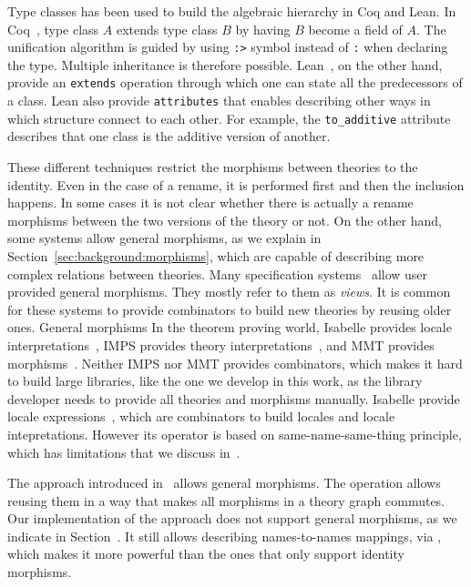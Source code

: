 Type classes has been used to build the algebraic hierarchy in Coq and Lean. In Coq~\cite{spitters2011type}, type class $A$ extends type class $B$ by having $B$ become a field of $A$. The unification algorithm is guided by using \verb|:>| symbol instead of \verb|:| when declaring the type. Multiple inheritance is therefore possible. Lean~\cite{lean2019}, on the other hand, provide an \verb|extends| operation through which one can state all the predecessors of a class. Lean also provide \verb|attributes| that enables describing other ways in which structure connect to each other. For example, the \verb|to_additive| attribute describes that one class is the additive version of another.

These different techniques restrict the morphisms between theories to the identity. Even in the case of a rename, it is performed first and then the inclusion happens. In some cases it is not clear whether there is actually a rename morphisms between the two versions of the theory or not. On the other hand, some systems allow general morphisms, as we explain in Section~\ref{sec:background:morphisms}, which are capable of describing more complex relations between theories. Many specification systems~\cite{Goguen1980, CoFI:2004:CASL-RM, Smith99, duran2007maude} allow user provided general morphisms. They mostly refer to them as \emph{views}. It is common for these systems to provide combinators to build new theories by reusing older ones. General morphisms In the theorem proving world, Isabelle provides locale interpretations~\cite{localeIntepretations2006}, IMPS provides theory interpretations~\cite{farmer1993imps}, and MMT provides morphisms~\cite{rabe2013scalable}. Neither IMPS nor MMT provides combinators, which makes it hard to build large libraries, like the one we develop in this work, as the library developer needs to provide all theories and morphisms manually. Isabelle provide locale expressions~\cite{ballarin2003locales}, which are combinators to build locales and locale intepretations. However its  operator is based on same-name-same-thing principle, which has limitations that we discuss in~\cite{carette2018building}. 

The approach introduced in~\cite{carette2018building} allows general morphisms. The  operation allows reusing them in a way that makes all morphisms in a theory graph commutes. Our implementation of the approach does not support general morphisms, as we indicate in Section~. It still allows describing names-to-names mappings, via , which makes it more powerful than the ones that only support identity morphisms. 


